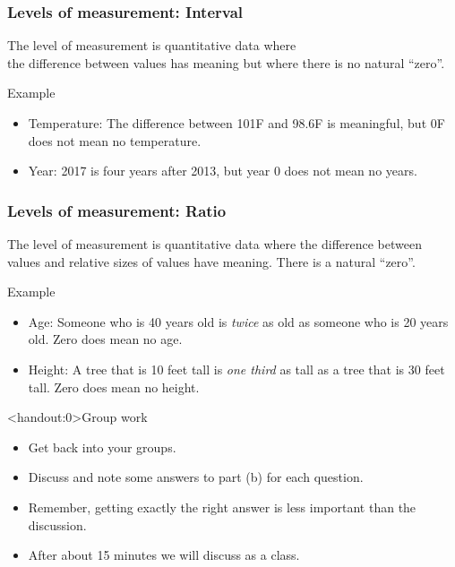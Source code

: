 \documentclass[xcolor=table]{beamer}
\begin{document}
\begin{frame}
\frametitle{Levels of measurement: Interval}
\begin{block}{}
\large The  level of measurement is quantitative data where\\ the difference between values has meaning but where there is no natural ``zero''.
\end{block}
\pause
\begin{exampleblock}{Example}
\begin{itemize}
\item Temperature: The difference between 101\textdegree F and 98.6\textdegree F is meaningful, but 0\textdegree F does not mean no temperature.
\item Year: 2017 is four years after 2013, but year 0 does not mean no years.
\end{itemize}
\end{exampleblock}
\end{frame}

\begin{frame}
\frametitle{Levels of measurement: Ratio}
\begin{block}{}
\large The  level of measurement is quantitative data where the difference between values and relative sizes of values have meaning. There is a natural ``zero''.
\end{block}
\pause
\begin{exampleblock}{Example}
\begin{itemize}
\item Age: Someone who is 40 years old is \emph{twice} as old as someone who is 20 years old. Zero does mean no age.

\item Height: A tree that is 10 feet tall is \emph{one third} as tall as a tree that is 30 feet tall. Zero does mean no height.
\end{itemize}

\end{exampleblock}
\end{frame}

\begin{frame}<handout:0>{Group work}
\begin{block}{}
\large
\begin{itemize}
\item Get back into your groups.
\item Discuss and note some answers to part (b) for each question.
\item Remember, getting exactly the right answer is less important than the discussion.
\item After about 15 minutes we will discuss as a class. 
\end{itemize}
\end{block}
\end{frame}
\end{document}
